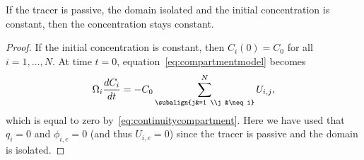 \begin{property} \label{prop2_comp}
	If the tracer is passive, the domain isolated and the initial concentration is constant, then the concentration stays constant.
\end{property}
\begin{proof}
	If the initial concentration is constant, then $C_i(0) = C_0$ for all $i = 1,\dots,N$. At time $t=0$, equation~\eqref{eq:compartmentmodel} becomes
	\begin{equation}
		\Omega_i \frac{dC_i}{dt} = -C_0 \sum_{\subalign{j&=1 \\j &\neq i}}^N U_{i,j},
	\end{equation}
	which is equal to zero by~\eqref{eq:continuitycompartment}. Here we have used that $q_i = 0$ and $\phi_{i,e} = 0$ (and thus $U_{i,e}=0$) since the tracer is passive and the domain is isolated.
\end{proof}

